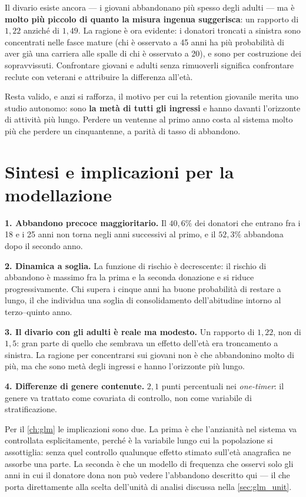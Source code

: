 Il divario esiste ancora --- i giovani abbandonano più spesso degli adulti ---
ma è \textbf{molto più piccolo di quanto la misura ingenua suggerisca}: un
rapporto di $1{,}22$ anziché di $1{,}49$. La ragione è ora evidente: i donatori troncati a sinistra
sono concentrati nelle fasce mature (chi è osservato a 45 anni ha più
probabilità di aver già una carriera alle spalle di chi è osservato a 20), e
sono per costruzione dei sopravvissuti. Confrontare giovani e adulti senza
rimuoverli significa confrontare reclute con veterani e attribuire la
differenza all'età.

Resta valido, e anzi si rafforza, il motivo per cui la retention giovanile
merita uno studio autonomo: sono \textbf{la metà di tutti gli ingressi} e hanno davanti
l'orizzonte di attività più lungo. Perdere un ventenne al primo anno costa al
sistema molto più che perdere un cinquantenne, a parità di tasso di abbandono.

\section{Sintesi e implicazioni per la modellazione}
\label{sec:ret_summary}

\textbf{1. Abbandono precoce maggioritario.}
Il $40{,}6\%$ dei donatori che entrano fra i 18 e i 25 anni non torna negli anni
successivi al primo, e il $52{,}3\%$ abbandona dopo il secondo anno.

\textbf{2. Dinamica a soglia.}
La funzione di rischio è decrescente: il rischio di abbandono è massimo fra la
prima e la seconda donazione e si riduce progressivamente. Chi supera i cinque
anni ha buone probabilità di restare a lungo, il che individua una soglia di
consolidamento dell'abitudine intorno al terzo--quinto anno.

\textbf{3. Il divario con gli adulti è reale ma modesto.}
Un rapporto di $1{,}22$, non di $1{,}5$: gran parte di quello che sembrava un
effetto dell'età era troncamento a sinistra. La ragione per concentrarsi sui
giovani non è che abbandonino molto di più, ma che sono metà degli ingressi e
hanno l'orizzonte più lungo.

\textbf{4. Differenze di genere contenute.}
$2{,}1$ punti percentuali nei \emph{one-timer}: il genere va trattato come
covariata di controllo, non come variabile di stratificazione.

Per il \cref{ch:glm} le implicazioni sono due. La prima è che l'anzianità nel
sistema va controllata esplicitamente, perché è la variabile lungo cui la
popolazione si assottiglia: senza quel controllo qualunque effetto stimato
sull'età anagrafica ne assorbe una parte. La seconda è che un modello di
frequenza che osservi solo gli anni in cui il donatore dona non può vedere
l'abbandono descritto qui --- il che porta direttamente alla scelta dell'unità
di analisi discussa nella \cref{sec:glm_unit}.

